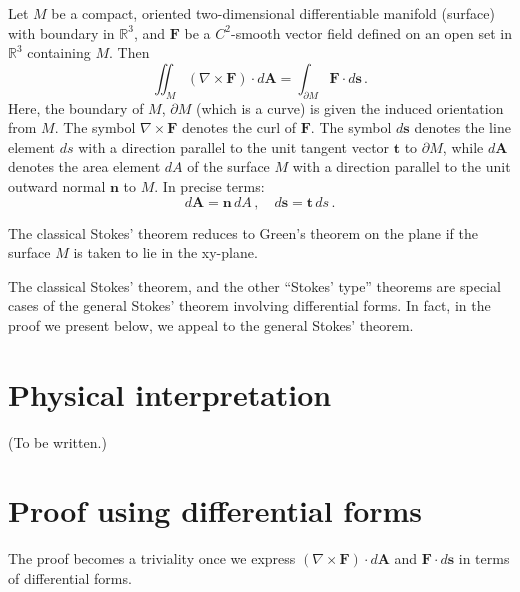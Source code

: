 \documentclass[12pt]{article}
\newcommand{\real}{\mathbb{R}}
\newcommand{\vF}{\mathbf{F}}
\newcommand{\vA}{\mathbf{A}}
\newcommand{\vs}{\mathbf{s}}
\newcommand{\vn}{\mathbf{n}}
\newcommand{\vt}{\mathbf{t}}
\begin{document}
Let $M$ be a compact, oriented two-dimensional differentiable manifold (surface) with boundary in $\real^3$,
and $\vF$ be a $C^2$-smooth vector field defined on an open set in $\real^3$ containing $M$.
Then
\[
\iint_M (\nabla \times \vF) \cdot d\vA = \int_{\partial M} \vF \cdot d\vs\,.
\]
Here, the boundary of $M$, $\partial M$ (which is a curve)
is given the induced orientation from $M$.  The symbol $\nabla \times \vF$
denotes the curl of $\vF$.
The symbol $d \vs$ denotes the line element $ds$ with a direction
parallel to the unit tangent vector $\vt$ to $\partial M$, while $d \vA$ denotes
the area element $dA$ of the surface $M$ with a direction parallel to the unit outward normal $\vn$
to $M$.  In precise terms:
\[
d\vA = \vn \, dA\,, \quad d\vs = \vt \, ds\,.
\]

The classical Stokes' theorem reduces to Green's theorem on the plane if the surface $M$
is taken to lie in the xy-plane.

The classical Stokes' theorem, and 
the other ``Stokes' type'' theorems
are special cases of the general Stokes' theorem involving
differential forms.
In fact, in the proof we present below, we appeal to the general Stokes' theorem.

\section*{Physical interpretation}
(To be written.)

\section*{Proof using differential forms}
The proof becomes a triviality once we express
$(\nabla \times \vF) \cdot d\vA$
and $\vF \cdot d\vs$ in terms of differential forms.
\end{document}
